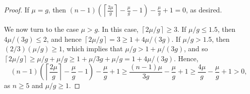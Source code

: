 \documentclass[10pt,a4paper]{amsart}
\newcommand\roundup[1]{\left\lceil#1\right\rceil}
\begin{document}
\begin{proof}
If $\mu =g$, then
$
(n-1)\left(\roundup{\frac{2\mu}g}-\frac {\mu}g -1\right) -\frac {\mu}g +1= 0$, as desired.

We now turn to the case $\mu >g$. In this case, $\roundup{2\mu/g} \ge 3$. If $\mu/g \le 1.5$,  then $4\mu/(3g) \le 2$, and hence $\roundup{2\mu/g} =3\ge 1 +4\mu/(3g)$.  If $\mu/g > 1.5$, then $(2/3) (\mu/g) \ge 1$, which implies that $\mu/g > 1 + \mu/(3g)$, and so $\roundup{2\mu/g} \ge \mu/g +\mu/g \ge 1+\mu/3g + \mu/g = 1 +4\mu/(3g)$.
Hence,
\[
(n-1)\left(\roundup{\frac{2\mu}g}-\frac {\mu}g -1\right) -\frac {\mu}g +1\ge \frac{(n-1)\mu}{3g} -\frac{\mu}g +1 \ge \frac {4\mu} g -\frac {\mu}g +1  > 0,
\]
as $n \ge 5$ and $\mu/g \ge 1$.
\end{proof}
\end{document}
